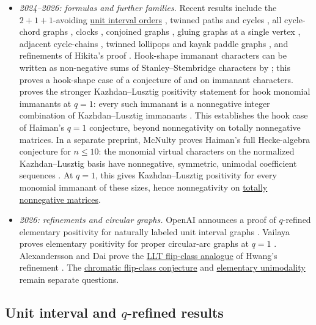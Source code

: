 \begin{itemize}
\item
\emph{2024--2026: formulas and further families.}
Recent results include the $2+1+1$-avoiding
\hyperref[unitIntervalOrder]{unit interval orders}
\cite{McDonoughPylyavskyyWang2024x}, twinned paths and cycles
\cite{BanaianCelanoChangLeeColmenarejoGoffKimbleKimpelLentferLiangSundaram2025},
all cycle-chord graphs \cite{Wang2025}, clocks \cite{ChenHeWang2026},
conjoined graphs \cite{QiTangWang2025}, gluing graphs at a single vertex
\cite{TomVailaya2025x}, adjacent cycle-chains \cite{TomVailayaAdjacent2026},
twinned lollipops and kayak paddle graphs \cite{TangWang2024x}, and
refinements of Hikita's proof
\cite{HuhHwangKimKimOh2025x,GriffinMellitRomeroWeiglWen2025x}.
Hook-shape immanant characters can be written as non-negative sums of
Stanley--Stembridge characters by 
\cite{Lesnevich2024}; this proves a hook-shape case of a conjecture of
 and  on immanant characters.
 proves the stronger Kazhdan--Lusztig positivity
statement for hook monomial immanants at $q=1$: every such immanant is a
nonnegative integer combination of Kazhdan--Lusztig immanants
\cite[Thm.~3]{McNulty2026x}. This establishes the hook case of Haiman's
$q=1$ conjecture, beyond nonnegativity on totally nonnegative matrices.
In a separate preprint, McNulty proves Haiman's full Hecke-algebra
conjecture for $n\leq10$: the monomial virtual
characters on the normalized Kazhdan--Lusztig basis have nonnegative,
symmetric, unimodal coefficient sequences
\cite[Thm.~1.3]{McNulty2026Finite}.
At $q=1$, this gives Kazhdan--Lusztig positivity for every monomial
immanant of these sizes, hence nonnegativity on
\hyperref[totalPositivity]{totally nonnegative matrices}.
\item
\emph{2026: refinements and circular graphs.}
OpenAI announces a proof of $q$-refined elementary positivity for naturally
labeled unit interval graphs \cite{OpenAI2026ChromaticPositivity}.
Vailaya proves elementary positivity for proper circular-arc graphs at $q=1$
\cite{Vailaya2026x}. Alexandersson and Dai prove the
\hyperref[unicellularLLTFlipClassExpansion]{LLT flip-class analogue} of
Hwang's refinement \cite{AlexanderssonDai2026Flipx}. The
\hyperref[chromaticEFlipComponents]{chromatic flip-class conjecture} and
\hyperref[chromaticEUnimodalityConjecture]{elementary unimodality}
remain separate questions.
\end{itemize}


\subsection[chromaticEExpansionQRefined]{Unit interval and $q$-refined results}

